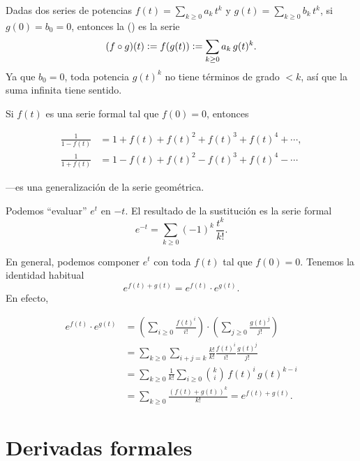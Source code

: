 \documentclass{article}
\begin{document}
\begin{definicion*}
Dadas dos series de potencias $f (t) = \sum_{k \ge 0} a_k \, t^k$ y $g (t) = \sum_{k \ge 0} b_k \, t^k$, si $g (0) = b_0 = 0$, entonces la  () es la serie
$$(f \circ g) (t) \mathrel{\mathop:}= f (g (t)) \mathrel{\mathop:}= \sum_{k \ge 0} a_k \, g (t)^k.$$
Ya que $b_0 = 0$, toda potencia $g (t)^k$ no tiene términos de grado $< k$, así que la suma infinita tiene sentido.
\end{definicion*}

\begin{ejemplo*}
Si $f (t)$ es una serie formal tal que $f (0) = 0$, entonces

\begin{align*}
\frac{1}{1 - f (t)} & = 1 + f(t) + f (t)^2 + f(t)^3 + f (t)^4 + \cdots,\\
\frac{1}{1 + f (t)} & = 1 - f(t) + f (t)^2 - f(t)^3 + f (t)^4 - \cdots
\end{align*}

\noindent ---es una generalización de la serie geométrica.
\end{ejemplo*}

\begin{ejemplo*}
Podemos ``evaluar'' $e^t$ en $-t$. El resultado de la sustitución es la serie formal
$$e^{-t} = \sum_{k \ge 0} (-1)^k\,\frac{t^k}{k!}.$$

En general, podemos componer $e^t$ con toda $f (t)$ tal que $f (0) = 0$. Tenemos la identidad habitual
$$e^{f(t) + g(t)} = e^{f(t)}\cdot e^{g(t)}.$$
En efecto,

\begin{align*}
e^{f(t)} \cdot e^{g(t)} & = \left(\sum_{i \ge 0} \frac{f(t)^i}{i!}\right) \cdot \left(\sum_{j \ge 0} \frac{g(t)^j}{j!}\right)\\
 & = \sum_{k \ge 0} \sum_{i+j = k} \frac{k!}{k!} \frac{f(t)^i}{i!} \frac{g(t)^j}{j!} \\
 & = \sum_{k \ge 0} \frac{1}{k!} \sum_{i \ge 0} {k \choose i} \, f(t)^i \, g(t)^{k-i} \\
 & = \sum_{k \ge 0} \frac{(f(t)+g(t))^k}{k!} = e^{f(t)+g(t)}.
\end{align*}
\end{ejemplo*}


\section*{Derivadas formales}
\end{document}

